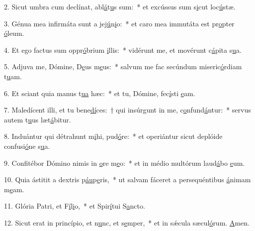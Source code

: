 2. Sicut umbra cum declínat, abl\uline{á}t\uline{u}s sum:~* et excússus sum s\uline{i}cut loc\uline{ú}stæ.\par 
3. Génua mea infirmáta sunt a jej\uline{ú}n\uline{i}o:~* et caro mea immutáta est pr\uline{o}pter \uline{ó}leum.\par 
4. Et ego factus sum oppr\uline{ó}brium \uline{i}llis:~* vidérunt me, et movérunt c\uline{á}pita s\uline{u}a.\par 
5. Adjuva me, Dómine, D\uline{e}us m\uline{e}us:~* salvum me fac secúndum miseric\uline{ó}rdiam t\uline{u}am.\par 
6. Et sciant quia manus t\uline{u}\uline{a} hæc:~* et tu, Dómine, fec\uline{í}sti \uline{e}am.\par 
7. Maledícent illi, et tu bene\uline{dí}ces:~† qui insúrgunt in me, c\uline{o}nfund\uline{á}ntur:~* servus autem t\uline{u}us læt\uline{á}bitur.\par 
8. Induántur qui détrahunt m\uline{i}hi, pud\uline{ó}re:~* et operiántur sicut deplóide confusi\uline{ó}ne s\uline{u}a.\par 
9. Confitébor Dómino nimis in \uline{o}re m\uline{e}o:~* et in médio multórum laud\uline{á}bo \uline{e}um.\par 
10. Quia ástitit a dextris p\uline{áu}p\uline{e}ris,~* ut salvam fáceret a persequéntibus \uline{á}nimam m\uline{e}am.\par 
11. Glória Patri, et F\uline{í}l\uline{i}o,~* et Spir\uline{í}tui S\uline{a}ncto.\par 
12. Sicut erat in princípio, et n\uline{u}nc, et s\uline{e}mper,~* et in sǽcula sæcul\uline{ó}rum. \uline{A}men.\par 
